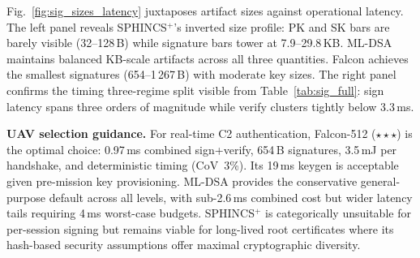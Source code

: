 Fig.~\ref{fig:sig_sizes_latency} juxtaposes artifact sizes against
operational latency.  The left panel reveals SPHINCS$^+$'s inverted
size profile: PK and SK bars are barely visible (32--128\,B) while
signature bars tower at 7.9--29.8\,KB.  ML-DSA maintains balanced
KB-scale artifacts across all three quantities.  Falcon achieves
the smallest signatures (654--1\,267\,B) with moderate key sizes.
The right panel confirms the timing three-regime split visible
from Table~\ref{tab:sig_full}: sign latency spans three orders of
magnitude while verify clusters tightly below 3.3\,ms.

\textbf{UAV selection guidance.}  For real-time C2 authentication,
Falcon-512 ($\star\star\star$) is the optimal choice: 0.97\,ms
combined sign+verify, 654\,B signatures, 3.5\,mJ per handshake,
and deterministic timing (CoV~3\%).  Its 19\,ms keygen is acceptable
given pre-mission key provisioning.  ML-DSA provides the
conservative general-purpose default across all levels, with
sub-2.6\,ms combined cost but wider latency tails requiring 4\,ms
worst-case budgets.  SPHINCS$^+$ is categorically unsuitable for
per-session signing but remains viable for long-lived root
certificates where its hash-based security assumptions offer
maximal cryptographic diversity.
